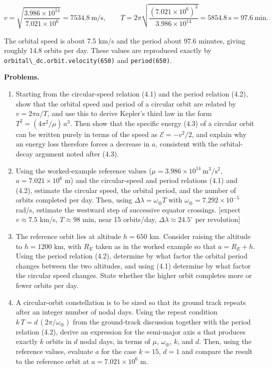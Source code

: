 \documentclass[
  11pt,
  openany,
  oneside]{book}
\newcommand{\passthrough}[1]{#1}
\begin{document}
\[v = \sqrt{\frac{3.986\times10^{14}}{7.021\times10^6}} = 7534.8\ \mathrm{m/s}, \qquad
T = 2\pi\sqrt{\frac{(7.021\times10^6)^3}{3.986\times10^{14}}} = 5854.8\ \mathrm{s} = 97.6\ \mathrm{min}.\]

The orbital speed is about 7.5 km/s and the period about 97.6 minutes,
giving roughly 14.8 orbits per day. These values are reproduced exactly
by \passthrough{\lstinline!orbital\_dc.orbit.velocity(650)!} and
\passthrough{\lstinline!period(650)!}.

\textbf{Problems.}

\begin{enumerate}
\def\labelenumi{\arabic{enumi}.}
\item
  Starting from the circular-speed relation (4.1) and the period
  relation (4.2), show that the orbital speed and period of a circular
  orbit are related by \(v = 2\pi a / T\), and use this to derive
  Kepler's third law in the form \(T^2 = (4\pi^2/\mu)\,a^3\). Then show
  that the specific energy (4.3) of a circular orbit can be written
  purely in terms of the speed as \(\mathcal{E} = -v^2/2\), and explain
  why an energy loss therefore forces a decrease in \(a\), consistent
  with the orbital-decay argument noted after (4.3).
\item
  Using the worked-example reference values
  (\(\mu = 3.986\times10^{14}\ \mathrm{m^3/s^2}\),
  \(a = 7.021\times10^6\) m) and the circular-speed and period relations
  (4.1) and (4.2), estimate the circular speed, the orbital period, and
  the number of orbits completed per day. Then, using
  \(\Delta\lambda = \omega_\oplus T\) with
  \(\omega_\oplus = 7.292\times10^{-5}\) rad/s, estimate the westward
  step of successive equator crossings. {[}expect \(v \approx 7.5\)
  km/s, \(T \approx 98\) min, near 15 orbits/day,
  \(\Delta\lambda \approx 24.5^\circ\) per revolution{]}
\item
  The reference orbit lies at altitude \(h = 650\) km. Consider raising
  the altitude to \(h = 1200\) km, with \(R_E\) taken as in the worked
  example so that \(a = R_E + h\). Using the period relation (4.2),
  determine by what factor the orbital period changes between the two
  altitudes, and using (4.1) determine by what factor the circular speed
  changes. State whether the higher orbit completes more or fewer orbits
  per day.
\item
  A circular-orbit constellation is to be sized so that its ground track
  repeats after an integer number of nodal days. Using the repeat
  condition \(k\,T = d\,(2\pi/\omega_\oplus)\) from the ground-track
  discussion together with the period relation (4.2), derive an
  expression for the semi-major axis \(a\) that produces exactly \(k\)
  orbits in \(d\) nodal days, in terms of \(\mu\), \(\omega_\oplus\),
  \(k\), and \(d\). Then, using the reference values, evaluate \(a\) for
  the case \(k = 15\), \(d = 1\) and compare the result to the reference
  orbit at \(a = 7.021\times10^6\) m.
\end{enumerate}
\end{document}
